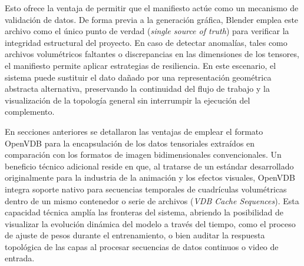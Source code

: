 Esto ofrece la ventaja de permitir que el manifiesto actúe como un mecanismo de validación de datos. De forma 
previa a la generación gráfica, Blender emplea este archivo como el único punto de verdad 
(\textit{single source of truth}) para verificar la integridad estructural del proyecto. En caso de detectar 
anomalías, tales como archivos volumétricos faltantes o discrepancias en las dimensiones de los tensores, el 
manifiesto permite aplicar estrategias de resiliencia. En este escenario, el sistema puede sustituir el dato 
dañado por una representación geométrica abstracta alternativa, preservando la continuidad del flujo de trabajo 
y la visualización de la topología general sin interrumpir la ejecución del complemento.
\medskip

En secciones anteriores se detallaron las ventajas de emplear el formato OpenVDB para la encapsulación de los 
datos tensoriales extraídos en comparación con los formatos de imagen bidimensionales convencionales. 
Un beneficio técnico adicional reside en que, al tratarse de un estándar desarrollado originalmente para la 
industria de la animación y los efectos visuales, OpenVDB integra soporte nativo para secuencias temporales 
de cuadrículas volumétricas dentro de un mismo contenedor o serie de archivos (\textit{VDB Cache Sequences}). 
Esta capacidad técnica amplía las fronteras del sistema, abriendo la posibilidad de visualizar la evolución 
dinámica del modelo a través del tiempo, como el proceso de ajuste de pesos durante el entrenamiento, o bien 
auditar la respuesta topológica de las capas al procesar secuencias de datos continuos o video de entrada.
